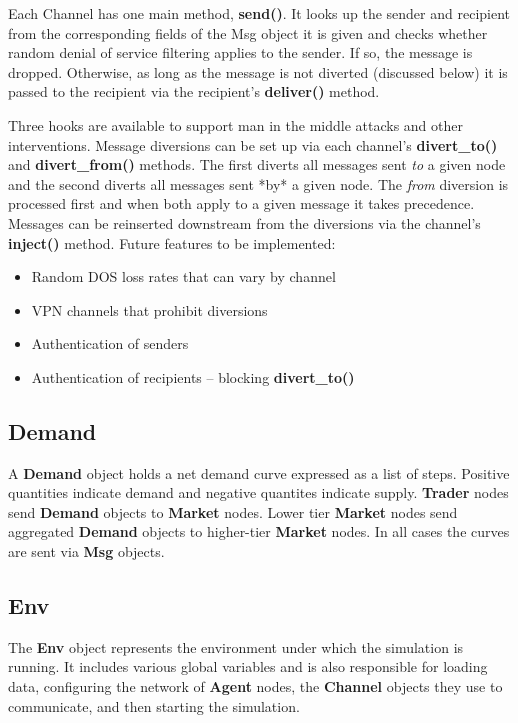 \documentclass[12pt]{article}
\begin{document}
Each Channel has one main method, \textbf{send()}.  It looks up the sender and 
recipient from the corresponding fields of the Msg object it is given and checks 
whether random denial of service filtering applies to the sender.  If so, 
the message is dropped. Otherwise, as long as the message is not diverted (discussed
below) it is passed to the recipient via the recipient's \textbf{deliver()} method.

Three hooks are available to support man in the middle attacks and other 
interventions.  Message diversions can be set up via each channel's 
\textbf{divert\_to()} and \textbf{divert\_from()} methods. The first diverts all 
messages sent \textit{to} a given node and the second diverts all messages sent
*by* a given node. The \textit{from} diversion is processed first and when both 
apply to a given message it takes precedence.  Messages can be reinserted 
downstream from the diversions via the channel's \textbf{inject()} method.  Future 
features to be implemented:

\begin{itemize}
  \item{Random DOS loss rates that can vary by channel}
  \item{VPN channels that prohibit diversions}
  \item{Authentication of senders}
  \item{Authentication of recipients -- blocking \textbf{divert\_to()}}
\end{itemize}

\subsection{Demand} \mbox{}
\label{subsec:objects_demand}

A \textbf{Demand} object holds a net demand curve expressed as a list of steps.
Positive quantities indicate demand and negative quantites indicate supply.
\textbf{Trader} nodes send \textbf{Demand} objects to \textbf{Market} nodes.  Lower tier 
\textbf{Market} nodes send aggregated \textbf{Demand} objects to higher-tier \textbf{Market} 
nodes.  In all cases the curves are sent via \textbf{Msg} objects.

\subsection{Env} \mbox{}
\label{subsec:objects_env}

The \textbf{Env} object represents the environment under which the simulation
is running.  It includes various global variables and is also responsible
for loading data, configuring the network of \textbf{Agent} nodes, 
the \textbf{Channel} objects they use to communicate, and then starting the
simulation.
\end{document}
